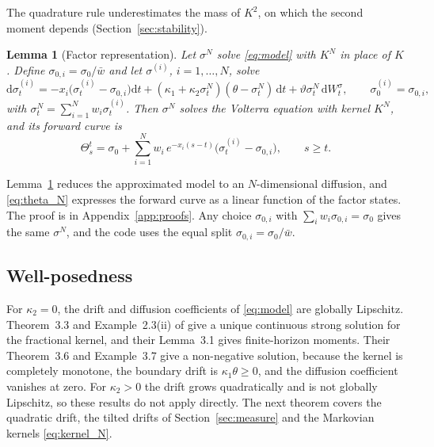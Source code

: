 \documentclass{rQUF2e}
\theoremstyle{plain}
\newtheorem{lemma}[theorem]{Lemma}
\theoremstyle{definition}
\theoremstyle{remark}
\newcommand{\D}{\mathrm{d}}
\begin{document}
The quadrature rule underestimates the mass of $K^2$, on which the second moment depends (Section~\ref{sec:stability}).

\begin{lemma}[Factor representation]\label{lem:factors}
Let $\sigma^N$ solve \eqref{eq:model} with $K^N$ in place of $K$. Define $\sigma_{0,i}=\sigma_0/\bar w$ and let $\sigma^{(i)}$, $i=1,\dots,N$, solve
\begin{equation}\label{eq:factors}
\D\sigma^{(i)}_t=-x_i\big(\sigma^{(i)}_t-\sigma_{0,i}\big)\D t+(\kappa_1+\kappa_2\sigma^N_t)(\theta-\sigma^N_t)\,\D t+\vartheta\sigma^N_t\,\D W^\sigma_t,\qquad \sigma^{(i)}_0=\sigma_{0,i},
\end{equation}
with $\sigma^N_t=\sum_{i=1}^N w_i\sigma^{(i)}_t$. Then $\sigma^N$ solves the Volterra equation with kernel $K^N$, and its forward curve is
\begin{equation}\label{eq:theta_N}
\Theta^{t}_s=\sigma_0+\sum_{i=1}^N w_i\,e^{-x_i(s-t)}\big(\sigma^{(i)}_t-\sigma_{0,i}\big),\qquad s\ge t .
\end{equation}
\end{lemma}

Lemma~\ref{lem:factors} reduces the approximated model to an $N$-dimensional diffusion, and \eqref{eq:theta_N} expresses the forward curve as a linear function of the factor states. The proof is in Appendix~\ref{app:proofs}. Any choice $\sigma_{0,i}$ with $\sum_i w_i\sigma_{0,i}=\sigma_0$ gives the same $\sigma^N$, and the code uses the equal split $\sigma_{0,i}=\sigma_0/\bar w$.

\subsection{Well-posedness}

For $\kappa_2=0$, the drift and diffusion coefficients of \eqref{eq:model} are globally Lipschitz. Theorem~3.3 and Example~2.3(ii) of \citet{AbiJaberLarssonPulido2019} give a unique continuous strong solution for the fractional kernel, and their Lemma~3.1 gives finite-horizon moments. Their Theorem~3.6 and Example~3.7 give a non-negative solution, because the kernel is completely monotone, the boundary drift is $\kappa_1\theta\ge0$, and the diffusion coefficient vanishes at zero. For $\kappa_2>0$ the drift grows quadratically and is not globally Lipschitz, so these results do not apply directly. The next theorem covers the quadratic drift, the tilted drifts of Section~\ref{sec:measure} and the Markovian kernels \eqref{eq:kernel_N}.
\end{document}
